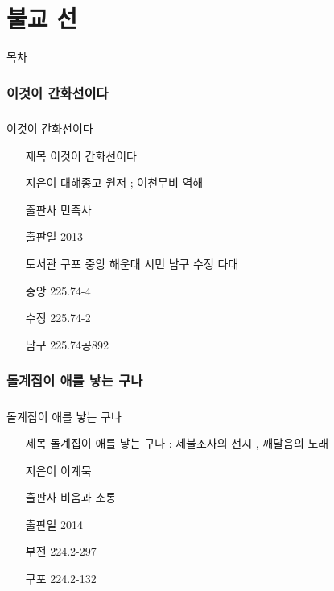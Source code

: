 \documentclass[aspectratio=1610,14pt,xcolor=pdftex,dvipsnames,table,handout]{beamer}
\begin{document}
		\part{ 불교 선 }
		\frame{\partpage}

		\begin{frame} [plain]{목차}
		\tableofcontents%
		\end{frame}


		\section{ 이것이 간화선이다 }
		\begin{frame} [t,plain]
		\frametitle{}
			\begin{block} { 이것이 간화선이다 }
			\setlength{\leftmargini}{4em}			
			\begin{itemize}
				\item [제목]  	이것이 간화선이다 
				\item [지은이]	대햬종고 원저 ; 여천무비 역해
				\item [출판사]	민족사
				\item [출판일]	2013
				\item [도서관]	구포 중앙 해운대 시민 남구 수정 다대
				\item [중앙]		225.74-4
				\item [수정]		225.74-2
				\item [남구]		225.74공892
			\end{itemize}
			\end{block}						
		\end{frame}						


		\section{ 돌계집이 애를 낳는 구나 }
		\begin{frame} [t,plain]
		\frametitle{}
			\begin{block} { 돌계집이 애를 낳는 구나 }
			\setlength{\leftmargini}{4em}			
			\begin{itemize}
				\item [제목]  	돌계집이 애를 낳는 구나 : 제불조사의 선시 , 깨달음의 노래
				\item [지은이]	이계묵
				\item [출판사]	비움과 소통
				\item [출판일]	2014
				\item [부전]		224.2-297
				\item [구포]		224.2-132
			\end{itemize}
			\end{block}						
		\end{frame}						
\end{document}
